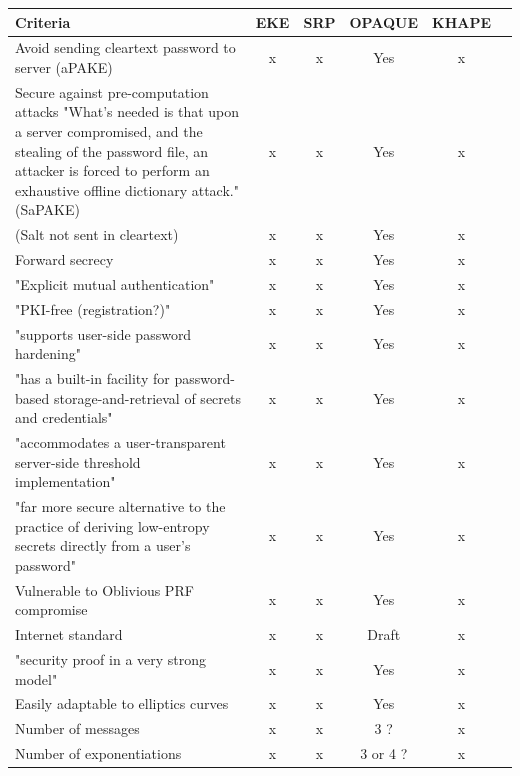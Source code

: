 \documentclass[../report.tex]{subfiles}
\begin{document}
\begin{center}
   \begin{tabular}{ | p{8cm} || c | c | c | c | c | }
     \hline
     \textbf{Criteria} & \textbf{EKE} & \textbf{SRP} & \textbf{OPAQUE} & \textbf{KHAPE} \\ \hline
     
     
     
     Avoid sending cleartext password to server (aPAKE) & x & x & Yes & x \\ \hline
     
     Secure against pre-computation attacks {"What's needed is that upon a server compromised, and the stealing of the password file, an attacker is forced to perform an exhaustive offline dictionary attack."} (SaPAKE) & x & x & Yes & x \\ \hline
     
     (Salt not sent in cleartext) & x & x & Yes & x \\ \hline
     Forward secrecy & x & x & Yes & x \\ \hline
     "Explicit mutual authentication" & x & x & Yes & x \\ \hline
     "PKI-free (registration?)" & x & x & Yes & x \\ \hline
     "supports user-side password hardening" & x & x & Yes & x \\ \hline
     "has a built-in facility for password-based storage-and-retrieval of secrets and credentials" & x & x & Yes & x \\ \hline
     "accommodates a user-transparent server-side threshold implementation" & x & x & Yes & x \\ \hline
     "far more secure alternative to the practice of deriving low-entropy secrets directly from a user's password" & x & x & Yes & x \\ \hline
     
     Vulnerable to Oblivious PRF compromise & x & x & Yes & x \\ \hline
     Internet standard & x & x & Draft & x \\ \hline
     
     "security proof in a very strong model" & x & x & Yes & x \\ \hline
     
     
     Easily adaptable to elliptics curves & x & x & Yes & x \\ \hline
     Number of messages & x & x & 3 ? & x \\ \hline
     Number of exponentiations & x & x & 3 or 4 ? & x \\ \hline

     \end{tabular}
 \end{center}
\end{document}

